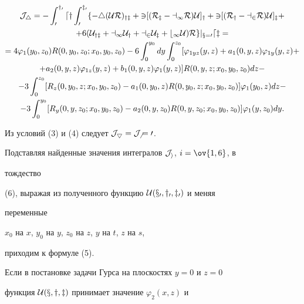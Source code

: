 \begin{gather*} 


\J_4=-\int^{y_0}_0 dy\int^{z_0}_0 \{-4(\U R)_{yz}+3[(R_z-a_1R) 


\U]_y+3[(R_y-a_2R)\U]_z+ \\ 


% 


+6(\U_{yz}+a_1\U_y+a_2\U_z+b_1\U)R\}|_{x=0}dz = \\ 


% 


=4\varphi_1(y_0,z_0)R(0,y_0,z_0;x_0,y_0,z_0)- 


6\int^{y_0}_0 dy\int^{z_0}_0[\varphi_{1yz}(y,z)+a_1(0,y,z) 


\varphi_{1y}(y,z)+ \\ 


% 


+a_2(0,y,z)\varphi_{1z}(y,z)+b_1(0,y,z)\varphi_1(y,z)] 


R(0,y,z;x_0,y_0,z_0)dz- \\ 


% 


-3\int^{z_0}_0[R_z(0,y_0,z;x_0,y_0,z_0)-a_1(0,y_0,z) 


R(0,y_0,z;x_0,y_0,z_0)]\varphi_1(y_0,z)dz -\\ 


% 


-3\int^{y_0}_0 [R_y(0,y,z_0;x_0,y_0,z_0)-a_2(0,y,z_0) 


R(0,y,z_0;x_0,y_0,z_0)]\varphi_1(y,z_0)dy. 


\end{gather*} 


 


Из условий (3) и (4) следует $\cal J_5=\cal J_6=0$. 


Подставляя найденные значения интегралов $\cal J_i$, $i=\ov{1,6}$, в 


тождество 


(6), выражая из полученного функцию $\cal U(x_0,y_0,z_0)$ и меняя 


переменные 


$x_0$ на $x$, $y_0$ на $y$, $z_0$ на $z$, $y$ на $t$, $z$ на $s$, 


приходим к формуле (5). 


 


Если в постановке задачи Гурса на плоскостях $y=0$ и $z=0$ 


функция $\cal U(x,y,z)$ принимает значение $\varphi_2(x,z)$ и 


